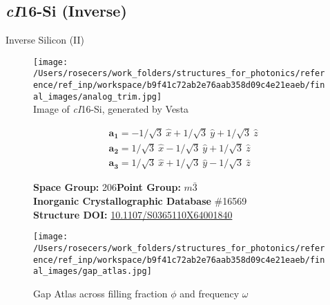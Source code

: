 \subsection{\large{\textit{cI}16-Si (Inverse)}}\vspace{-0.1in}
Inverse Silicon (II)


\begin{figure}[H]
\begin{minipage}{0.34\textwidth}\centering
\texttt{[image: /Users/rosecers/work\_folders/structures\_for\_photonics/reference/ref\_inp/workspace/b9f41c72ab2e76aab358d09c4e21eaeb/final\_images/analog\_trim.jpg]}\\
\small{Image of \textit{cI}16-Si, generated by Vesta}
\end{minipage}\hfill
\begin{minipage}{0.65\textwidth}\raggedright
{\setlength{\mathindent}{0cm}
\begin{equation*}
\begin{split}&\boldsymbol{a_1} = -1/\sqrt{3}\ \hat{x} + 1/\sqrt{3}\ \hat{y} + 1/\sqrt{3}\ \hat{z}\\[-8pt]
&\boldsymbol{a_2} = 1/\sqrt{3}\ \hat{x} - 1/\sqrt{3}\ \hat{y} + 1/\sqrt{3}\ \hat{z}\\[-8pt]
&\boldsymbol{a_3} = 1/\sqrt{3}\ \hat{x} + 1/\sqrt{3}\ \hat{y} - 1/\sqrt{3}\ \hat{z}
\end{split}
\end{equation*}}

\textbf{Space Group:}	206\hspace{0.5in}\textbf{Point Group:}	$m\bar{3}$\\
\textbf{Inorganic Crystallographic Database} \#16569\\
\textbf{Structure DOI: }\url{10.1107/S0365110X64001840}

\end{minipage}\hfill
\end{figure}
\vspace{-0.25in}


\begin{figure}[H]
\begin{minipage}{0.9\textwidth}\centering
\texttt{[image: /Users/rosecers/work\_folders/structures\_for\_photonics/reference/ref\_inp/workspace/b9f41c72ab2e76aab358d09c4e21eaeb/final\_images/gap\_atlas.jpg]}
\\
\end{minipage}\hfill\caption{Gap Atlas across filling fraction $\phi$ and frequency $\omega$}
\end{figure}


